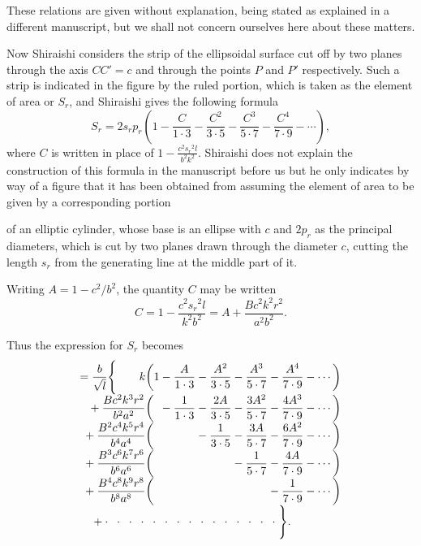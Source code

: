 \documentclass[11pt]{article}
\newcommand{\scanpage}[2]{\clearpage\setcounter{footnote}{0}\noindent{\footnotesize\color{gray}PDF page #1 · #2}\par\medskip}
\begin{document}
These relations are given without explanation, being stated as explained in a different manuscript, but we shall not concern ourselves here about these matters.

Now Shiraishi considers the strip of the ellipsoidal surface cut off by two planes through the axis $CC'=c$ and through the points $P$ and $P'$ respectively. Such a strip is indicated in the figure by the ruled portion, which is taken as the element of area or $S_r$, and Shiraishi gives the following formula
\[
S_r=2s_rp_r\left(1-\frac{C}{1\cdot3}-\frac{C^2}{3\cdot5}-\frac{C^3}{5\cdot7}-\frac{C^4}{7\cdot9}-\cdots\right),
\]
where $C$ is written in place of $1-\frac{c^2{s_r}^2l}{b^2k^2}$. Shiraishi does not explain the construction of this formula in the manuscript before us but he only indicates by way of a figure that it has been obtained from assuming the element of area to be given by a corresponding portion

\scanpage{0272}{printed page 258}
\noindent of an elliptic cylinder, whose base is an ellipse with $c$ and $2p_r$ as the principal diameters, which is cut by two planes drawn through the diameter $c$, cutting the length $s_r$ from the generating line at the middle part of it.

Writing $A=1-c^2/b^2$, the quantity $C$ may be written
\[
C=1-\frac{c^2s_r{}^2l}{k^2b^2}=A+\frac{Bc^2k^2r^2}{a^2b^2}.
\]

Thus the expression for $S_r$ becomes
\[
\begin{array}{r@{}l@{}l@{}l@{}l@{}l@{}l}
=\dfrac{b}{\sqrt{l}}\Biggl\{\qquad k\biggl( & 1 & {}-\dfrac{A}{1\cdot 3} & {}-\dfrac{A^2}{3\cdot 5} & {}-\dfrac{A^3}{5\cdot 7} & {}-\dfrac{A^4}{7\cdot 9} & {}-\cdots\biggr)\\[2mm]
{}+\dfrac{Bc^2k^3r^2}{b^2a^2}\biggl( & & {}-\dfrac{1}{1\cdot 3} & {}-\dfrac{2A}{3\cdot 5} & {}-\dfrac{3A^2}{5\cdot 7} & {}-\dfrac{4A^3}{7\cdot 9} & {}-\cdots\biggr)\\[2mm]
{}+\dfrac{B^2c^4k^5r^4}{b^4a^4}\biggl( & & & {}-\dfrac{1}{3\cdot 5} & {}-\dfrac{3A}{5\cdot 7} & {}-\dfrac{6A^2}{7\cdot 9} & {}-\cdots\biggr)\\[2mm]
{}+\dfrac{B^3c^6k^7r^6}{b^6a^6}\biggl( & & & & {}-\dfrac{1}{5\cdot 7} & {}-\dfrac{4A}{7\cdot 9} & {}-\cdots\biggr)\\[2mm]
{}+\dfrac{B^4c^8k^9r^8}{b^8a^8}\biggl( & & & & & {}-\dfrac{1}{7\cdot 9} & {}-\cdots\biggr)\\[2mm]
\multicolumn{7}{l}{\quad{}+\cdot\;\;\cdot\;\;\cdot\;\;\cdot\;\;\cdot\;\;\cdot\;\;\cdot\;\;\cdot\;\;\cdot\;\;\cdot\;\;\cdot\;\;\cdot\;\;\cdot\;\;\cdot\;\;\cdot\;\Biggr\}.}
\end{array}
\]
\end{document}
